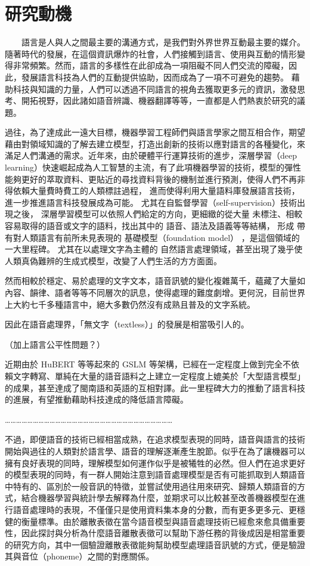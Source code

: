\section{研究動機}
　　語言是人與人之間最主要的溝通方式，是我們對外界世界互動最主要的媒介。隨著時代的發展，在這個資訊爆炸的社會，人們接觸到語言、使用與互動的情形變得非常頻繁。然而，語言的多樣性在此卻成為一項阻礙不同人們交流的障礙，因此，發展語言科技為人們的互動提供協助，因而成為了一項不可避免的趨勢。
  藉助科技與知識的力量，人們可以透過不同語言的視角去獲取更多元的資訊，激發思考、開拓視野，因此諸如語音辨識、機器翻譯等等，一直都是人們熱衷於研究的議題。

    過往，為了達成此一遠大目標，機器學習工程師們與語言學家之間互相合作，期望藉由對領域知識的了解去建立模型，打造出創新的技術以應對語言的各種變化，來滿足人們溝通的需求。近年來，由於硬體平行運算技術的進步，深層學習（deep learning）快速崛起成為人工智慧的主流，有了此項機器學習的技術，模型的彈性能夠更好的萃取資料、更貼近的尋找資料背後的機制並進行預測，使得人們不再非得依賴大量費時費工的人類標註過程，
進而使得利用大量語料庫發展語言技術，進一步推進語言科技發展成為可能。
尤其在自監督學習（self-supervision）技術出現之後，
深層學習模型可以依照人們給定的方向，更細緻的從大量
未標注、相較容易取得的語音或文字的語料，找出其中的
語音、語法及語義等等結構，
形成
帶有對人類語言有前所未見表現的
基礎模型（foundation model）
，是這個領域的一大里程碑。
尤其在以處理文字為主體的
自然語言處理領域，甚至出現了幾乎使人類真偽難辨的生成式模型，改變了人們生活的方方面面。

    然而相較於穩定、易於處理的文字文本，語音訊號的變化複雜萬千，蘊藏了大量如內容、韻律、語者等等不同層次的訊息，使得處理的難度劇增。更何況，目前世界上大約七千多種語言中，絕大多數仍然沒有成熟且普及的文字系統。
    
因此在語音處理界，「無文字（textless）」的發展是相當吸引人的。

（加上語言公平性問題？）

    近期由於 HuBERT 等等起來的 GSLM 等架構，已經在一定程度上做到完全不依賴文字轉寫、單純在大量的語音語料之上建立一定程度上媲美於「大型語言模型」的成果，甚至達成了閩南語和英語的互相對譯。此一里程碑大力的推動了語言科技的進展，有望推動藉助科技達成的降低語言障礙。

    ………………………………………………………………………………

   不過，即便語音的技術已經相當成熟，在追求模型表現的同時，語音與語言的技術開始與過往的人類對於語言學、語音的理解逐漸產生脫節。似乎在為了讓機器可以擁有良好表現的同時，理解模型如何運作似乎是被犧牲的必然。但人們在追求更好的模型表現的同時，有一群人開始注意到語音處理模型是否有可能抓取到人類語音中特有的、區別於一般音訊的特徵，並嘗試使用過往用來研究、歸類人類語音的方式，結合機器學習與統計學去解釋為什麼，並期求可以比較甚至改善機器模型在進行語音處理時的表現，不僅僅只是使用資料集本身的分數，而有更多更多元、更穩健的衡量標準。由於離散表徵在當今語音模型與語音處理技術已經愈來愈具備重要性，因此探討與分析為什麼語音離散表徵可以幫助下游任務的背後成因是相當重要的研究方向，其中一個驗證離散表徵能夠幫助模型處理語音訊號的方式，便是驗證其與音位（phoneme）之間的對應關係。

